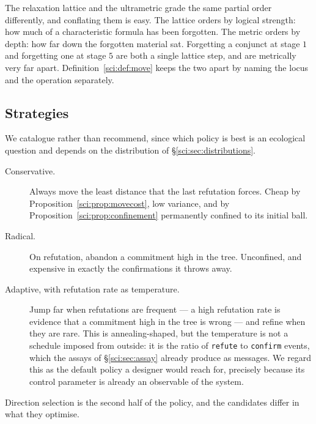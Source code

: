 \begin{remark}
\label{sci:rem:twogradings}
The relaxation lattice and the ultrametric grade the same partial order differently, and conflating
them is easy. The lattice orders by logical strength: how much of a characteristic formula has been
forgotten. The metric orders by depth: how far down the forgotten material sat. Forgetting a conjunct
at stage $1$ and forgetting one at stage $5$ are both a single lattice step, and are metrically very
far apart. Definition~\ref{sci:def:move} keeps the two apart by naming the locus and the operation
separately.
\end{remark}

\subsection{Strategies}\label{sci:S6.3}

We catalogue rather than recommend, since which policy is best is an ecological question and depends on
the distribution of \S\ref{sci:sec:distributions}.

\begin{description}
\item[Conservative.] Always move the least distance that the last refutation forces. Cheap by
Proposition~\ref{sci:prop:movecost}, low variance, and by Proposition~\ref{sci:prop:confinement} permanently
confined to its initial ball.

\item[Radical.] On refutation, abandon a commitment high in the tree. Unconfined, and expensive in
exactly the confirmations it throws away.

\item[Adaptive, with refutation rate as temperature.] Jump far when refutations are frequent --- a
high refutation rate is evidence that a commitment high in the tree is wrong --- and refine when they
are rare. This is annealing-shaped, but the temperature is not a schedule imposed from outside: it is
the ratio of \texttt{refute} to \texttt{confirm} events, which the assays of \S\ref{sci:sec:assay} already
produce as messages. We regard this as the default policy a designer would reach for, precisely
because its control parameter is already an observable of the system.
\end{description}

Direction selection is the second half of the policy, and the candidates differ in what they optimise.

